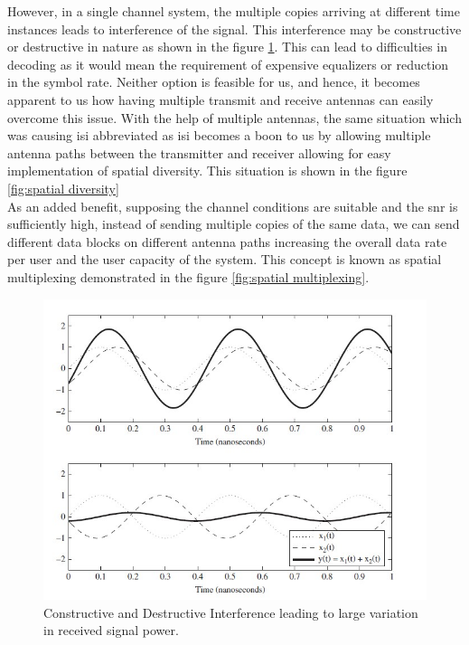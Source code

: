 However, in a single channel system, the multiple copies arriving at different time instances leads to interference of the signal. This interference may be constructive or destructive in nature as shown in the figure \ref{fig:constructive and destructive interference}. This can lead to difficulties in decoding as it would mean the requirement of expensive equalizers or reduction in the symbol rate. Neither option is feasible for us, and hence, it becomes apparent to us how having multiple transmit and receive antennas can easily overcome this issue. With the help of multiple antennas, the same situation which was causing \acrlong{isi} abbreviated as \acrshort{isi} becomes a boon to us by allowing multiple antenna paths between the transmitter and receiver allowing for easy implementation of \gls{spatial diversity}. This situation is shown in the figure \ref{fig:spatial diversity}\\
As an added benefit, supposing the channel conditions are suitable and the \acrshort{snr} is sufficiently high, instead of sending multiple copies of the same data, we can send different data blocks on different antenna paths increasing the overall data rate per user and the user capacity of the system. This concept is known as \gls{spatial multiplexing} demonstrated in the figure \ref{fig:spatial multiplexing}.
\begin{figure}[!htbp]
\centering
\includegraphics[scale=1]{Chapter 2/Figures/Interference}
\caption[Constructive and Destructive Interference of Signals]{Constructive and Destructive Interference leading to large variation in received signal power.}
\label{fig:constructive and destructive interference}
\end{figure}

